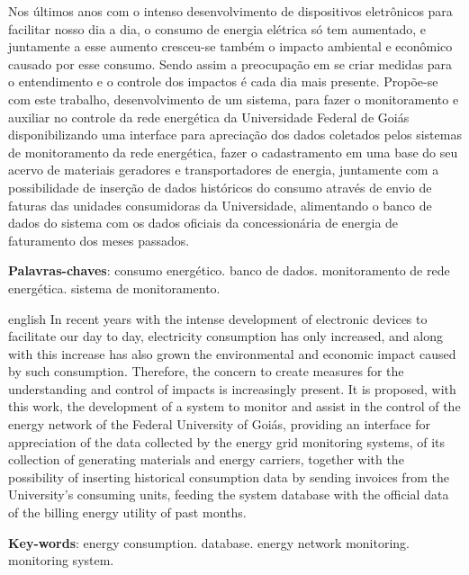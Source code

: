 \setlength{\absparsep}{18pt} %
\begin{resumo}
 Nos últimos anos com o intenso desenvolvimento de dispositivos eletrônicos para facilitar nosso dia a dia, o consumo de energia elétrica só tem aumentado, e juntamente a esse aumento cresceu-se também o impacto ambiental e econômico causado por esse consumo. Sendo assim a preocupação em se criar medidas para o entendimento e o controle dos impactos é cada dia mais presente. Propõe-se com este trabalho, desenvolvimento de um sistema, para fazer o monitoramento e auxiliar no controle da rede energética da Universidade Federal de Goiás disponibilizando uma interface para apreciação dos dados coletados pelos sistemas de monitoramento da rede energética, fazer o cadastramento em uma base do seu acervo de materiais geradores e transportadores de energia, juntamente com a possibilidade de inserção de dados históricos do consumo através de envio de faturas das unidades consumidoras da Universidade, alimentando o banco de dados do sistema com os dados oficiais da concessionária de energia de faturamento dos meses passados. 

 \textbf{Palavras-chaves}: consumo energético. banco de dados. monitoramento de rede energética. sistema de monitoramento.
\end{resumo}

\begin{resumo}[Abstract]
 \begin{otherlanguage*}{english}
   In recent years with the intense development of electronic devices to facilitate our day to day, electricity consumption has only increased, and along with this increase has also grown the environmental and economic impact caused by such consumption. Therefore, the concern to create measures for the understanding and control of impacts is increasingly present. It is proposed, with this work, the development of a system to monitor and assist in the control of the energy network of the Federal University of Goiás, providing an interface for appreciation of the data collected by the energy grid monitoring systems, of its collection of generating materials and energy carriers, together with the possibility of inserting historical consumption data by sending invoices from the University's consuming units, feeding the system database with the official data of the billing energy utility of past months.

   \vspace{\onelineskip}
 
   \noindent 
   \textbf{Key-words}: energy consumption. database. energy network monitoring. monitoring system.
 \end{otherlanguage*}
\end{resumo}